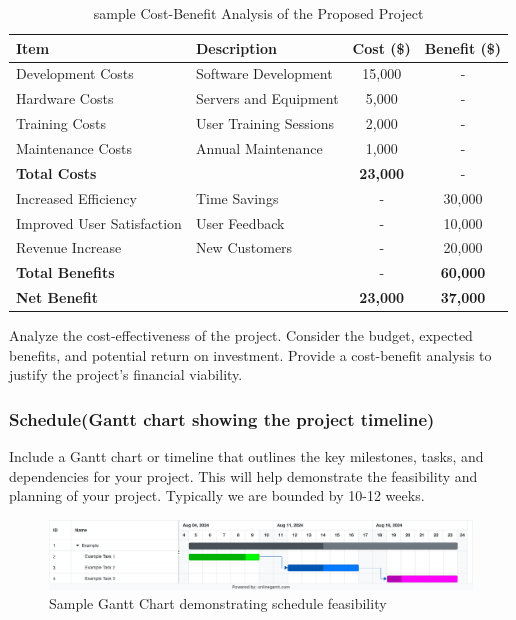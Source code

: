 \begin{table}[h]
    \centering
    \caption{sample Cost-Benefit Analysis of the Proposed Project}
    \begin{tabular}{@{}llcc@{}}
        \toprule
        \textbf{Item} & \textbf{Description} & \textbf{Cost (\$)} & \textbf{Benefit (\$)} \\ \midrule
        Development Costs & Software Development & 15,000 & - \\
        Hardware Costs & Servers and Equipment & 5,000 & - \\
        Training Costs & User Training Sessions & 2,000 & - \\
        Maintenance Costs & Annual Maintenance & 1,000 & - \\
        \midrule
        \textbf{Total Costs} &  & \textbf{23,000} & - \\ \midrule
        Increased Efficiency & Time Savings & - & 30,000 \\
        Improved User Satisfaction & User Feedback & - & 10,000 \\
        Revenue Increase & New Customers & - & 20,000 \\
        \midrule
        \textbf{Total Benefits} &  & - & \textbf{60,000} \\ \midrule
        \textbf{Net Benefit} &  & \textbf{23,000} & \textbf{37,000} \\ 
        \bottomrule
    \end{tabular}
    \label{tab:cost-benefit}
\end{table}

 Analyze the cost-effectiveness of the project. Consider the budget, expected benefits, and potential return on investment. Provide a cost-benefit analysis to justify the project's financial viability.
 
\subsubsection{Schedule(Gantt chart showing the project timeline)}
 Include a Gantt chart or timeline that outlines the key milestones, tasks, and dependencies for your project. This will help demonstrate the feasibility and planning of your project. Typically we are bounded by 10-12 weeks.
 
\begin{figure}[H]
    \centering
    \includegraphics[width=1\linewidth]{Images/gantt.png}
    \caption{Sample Gantt Chart demonstrating schedule feasibility}
    \label{fig:enter-label}
\end{figure}

